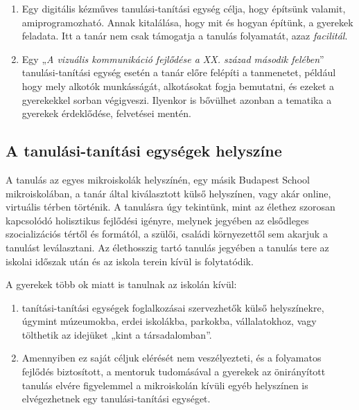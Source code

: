 \begin{enumerate}
      \item Egy digitális kézműves tanulási-tanítási egység célja, hogy építsünk valamit, ami\linebreak programozható. Annak kitalálása, hogy mit és hogyan építünk, a gyerekek feladata. Itt a tanár nem csak támogatja a tanulás folyamatát, azaz \emph{facilitál}.

      \item Egy „\emph{A vizuális kommunikáció fejlődése a XX. század második felében}'' tanulási-tanítási egység esetén a tanár előre felépíti a tanmenetet, például hogy mely alkotók munkásságát, alkotásokat fogja bemutatni, és ezeket a gyerekekkel sorban végigveszi. Ilyenkor is bővülhet azonban a tematika a gyerekek érdeklődése, felvetései mentén.

\end{enumerate}

\subsection{A tanulási-tanítási egységek helyszíne}

A tanulás az egyes mikroiskolák helyszínén, egy másik Budapest School mikroiskolában, a tanár által kiválasztott külső helyszínen, vagy akár online, virtuális térben történik. A tanulásra úgy tekintünk, mint az élethez szorosan kapcsolódó holisztikus fejlődési igényre, melynek jegyében az elsődleges szocializációs tértől és formától, a szülői, családi környezettől sem akarjuk a tanulást leválasztani. Az élethosszig tartó tanulás jegyében a tanulás tere az iskolai időszak után és az iskola terein kívül is folytatódik.

A gyerekek több ok miatt is tanulnak az iskolán kívül:

\begin{enumerate}
      \item tanítási-tanítási egységek foglalkozásai szervezhetők külső helyszínekre, úgymint múzeumokba, erdei iskolákba, parkokba, vállalatokhoz, vagy tölthetik az idejüket „kint a társadalomban''.

      \item Amennyiben ez saját céljuk elérését nem veszélyezteti, és a folyamatos fejlődés biztosított, a mentoruk tudomásával a gyerekek az önirányított tanulás elvére figyelemmel a mikroiskolán kívüli egyéb helyszínen is elvégezhetnek egy tanulási-tanítási egységet.
\end{enumerate}

